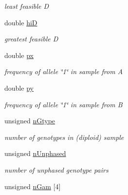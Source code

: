 \begin{DoxyCompactItemize}
\begin{DoxyCompactList}\small\item\em least feasible \-D \end{DoxyCompactList}\item 
\hypertarget{struct_dsq_data_abfab53744a39ef6d7bdebc293344d7a9}{double \hyperlink{struct_dsq_data_abfab53744a39ef6d7bdebc293344d7a9}{hi\-D}}\label{struct_dsq_data_abfab53744a39ef6d7bdebc293344d7a9}

\begin{DoxyCompactList}\small\item\em greatest feasible \-D \end{DoxyCompactList}\item 
\hypertarget{struct_dsq_data_a8bae4af34213c754abcef73f595e3e4a}{double \hyperlink{struct_dsq_data_a8bae4af34213c754abcef73f595e3e4a}{px}}\label{struct_dsq_data_a8bae4af34213c754abcef73f595e3e4a}

\begin{DoxyCompactList}\small\item\em frequency of allele \char`\"{}1\char`\"{} in sample from \-A \end{DoxyCompactList}\item 
\hypertarget{struct_dsq_data_aa3f221eac7bb1919a62b2f8b5489c3a4}{double \hyperlink{struct_dsq_data_aa3f221eac7bb1919a62b2f8b5489c3a4}{py}}\label{struct_dsq_data_aa3f221eac7bb1919a62b2f8b5489c3a4}

\begin{DoxyCompactList}\small\item\em frequency of allele \char`\"{}1\char`\"{} in sample from \-B \end{DoxyCompactList}\item 
\hypertarget{struct_dsq_data_ab6f188885c3a13ac49eee9ce9fd84445}{unsigned \hyperlink{struct_dsq_data_ab6f188885c3a13ac49eee9ce9fd84445}{n\-Gtype}}\label{struct_dsq_data_ab6f188885c3a13ac49eee9ce9fd84445}

\begin{DoxyCompactList}\small\item\em number of genotypes in (diploid) sample \end{DoxyCompactList}\item 
\hypertarget{struct_dsq_data_a996906c461f0ce756ae25e72fd889be2}{unsigned \hyperlink{struct_dsq_data_a996906c461f0ce756ae25e72fd889be2}{n\-Unphased}}\label{struct_dsq_data_a996906c461f0ce756ae25e72fd889be2}

\begin{DoxyCompactList}\small\item\em number of unphased genotype pairs \end{DoxyCompactList}\item 
\hypertarget{struct_dsq_data_adcf855e9e80223d33131cb0e2b44c53e}{unsigned \hyperlink{struct_dsq_data_adcf855e9e80223d33131cb0e2b44c53e}{n\-Gam} \mbox{[}4\mbox{]}}\label{struct_dsq_data_adcf855e9e80223d33131cb0e2b44c53e}


\end{DoxyCompactItemize}
